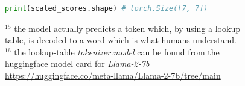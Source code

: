 \documentclass[12pt]{article}
\begin{document}
\begin{figure}[!htb]
\begin{minipage}[t]{0.65\textwidth}
\begin{lstlisting}[language=python,style=python,basicstyle=\ttfamily\footnotesize]
print(scaled_scores.shape) # torch.Size([7, 7])
\end{lstlisting}
\end{minipage}%
\hspace{25pt}
\begin{minipage}[t]{.4\textwidth}
  \raggedright
  \scriptsize 
  $^{15}$ the model actually predicts a token which, by using a lookup table, is decoded to a word which 
  is what humans understand.\\
  \vspace{2em}
  $^{16}$ the lookup-table {\it tokenizer.model} can be found from the huggingface model card for {\it Llama-2-7b}
  {\tiny \url{https://huggingface.co/meta-llama/Llama-2-7b/tree/main}}
\end{minipage}
\end{figure}
\pagebreak
\end{document}
